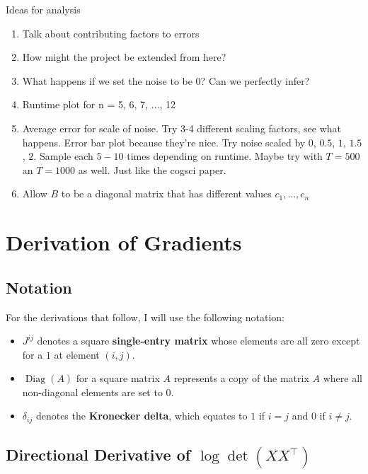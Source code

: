 \documentclass{article}
\theoremstyle{definition}
\DeclareMathOperator{\Diag}{Diag}
\begin{document}
Ideas for analysis

\begin{enumerate}
    \item Talk about contributing factors to errors
    \item How might the project be extended from here?
    \item What happens if we set the noise to be 0? Can we perfectly infer?
    \item Runtime plot for n = 5, 6, 7, $\ldots$, 12
    \item Average error for scale of noise. Try 3-4 different scaling factors, see what happens. Error bar plot because they're nice. Try noise scaled by $0$, $0.5$, $1$, $1.5$, $2$. Sample each $5-10$ times depending on runtime. Maybe try with $T=500$ an $T=1000$ as well. Just like the cogsci paper.
    \item Allow $B$ to be a diagonal matrix that has different values $c_1, \ldots, c_n$
\end{enumerate}

\appendix

\section{Derivation of Gradients}

\subsection{Notation}

For the derivations that follow, I will use the following notation:

\begin{itemize}
    \item $J^{ij}$ denotes a square \textbf{single-entry matrix} whose elements are all zero except for a $1$ at element $(i,j)$.
    \item $\Diag(A)$ for a square matrix $A$ represents a copy of the matrix $A$ where all non-diagonal elements are set to $0$.
    \item $\delta_{ij}$ denotes the \textbf{Kronecker delta}, which equates to $1$ if $i = j$ and $0$ if $i \neq j$.
\end{itemize}

\subsection{Directional Derivative of $\log \det (XX^\top)$}
\label{subsec:gradLogDetDerivation}
\end{document}
